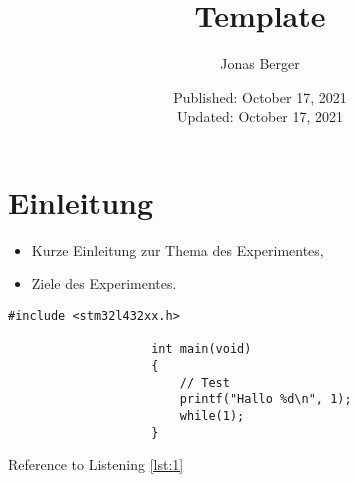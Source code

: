 \documentclass{article}
\title{Template}
\author{Jonas Berger}
\date{Published: October 17, 2021 \\ Updated: October 17, 2021}
\begin{document}
		\lstset{escapechar=@,style=customc}

        	\maketitle
        	\pagebreak
        	\tableofcontents
        	\pagebreak

        	\section{Einleitung}

	        \begin{itemize}
	        		\item Kurze Einleitung zur Thema des Experimentes,
	          	\item Ziele des Experimentes.
	        \end{itemize}
	        
	        \begin{lstlisting}[caption={example Listing},label={lst:1}]
	        		#include <stm32l432xx.h>
	        		
	        		int main(void)
	        		{
	        			// Test
	        			printf("Hallo %d\n", 1);
	        			while(1);
	        		}
		    \end{lstlisting}
			Reference to Listening \ref{lst:1}
			
		\pagebreak
		\lstlistoflistings
		\pagebreak
\end{document}
